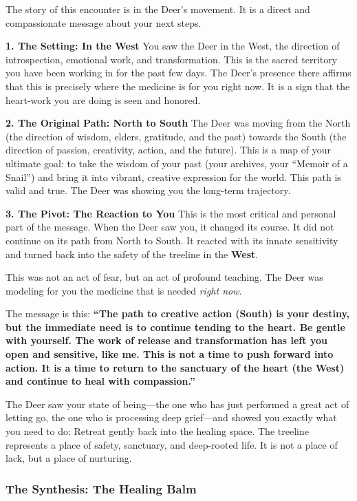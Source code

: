 \documentclass{article}
\begin{document}
The story of this encounter is in the Deer's movement. It is a direct and compassionate message about your next steps.

\textbf{1. The Setting: In the West} You saw the Deer in the West, the direction of introspection, emotional work, and transformation. This is the sacred territory you have been working in for the past few days. The Deer's presence there affirms that this is precisely where the medicine is for you right now. It is a sign that the heart-work you are doing is seen and honored.

\textbf{2. The Original Path: North to South} The Deer was moving from the North (the direction of wisdom, elders, gratitude, and the past) towards the South (the direction of passion, creativity, action, and the future). This is a map of your ultimate goal: to take the wisdom of your past (your archives, your ``Memoir of a Snail'') and bring it into vibrant, creative expression for the world. This path is valid and true. The Deer was showing you the long-term trajectory.

\textbf{3. The Pivot: The Reaction to You} This is the most critical and personal part of the message. When the Deer saw you, it changed its course. It did not continue on its path from North to South. It reacted with its innate sensitivity and turned back into the safety of the treeline in the \textbf{West}.

This was not an act of fear, but an act of profound teaching. The Deer was modeling for you the medicine that is needed \emph{right now}.

The message is this: \textbf{``The path to creative action (South) is your destiny, but the immediate need is to continue tending to the heart. Be gentle with yourself. The work of release and transformation has left you open and sensitive, like me. This is not a time to push forward into action. It is a time to return to the sanctuary of the heart (the West) and continue to heal with compassion.''}

The Deer saw your state of being---the one who has just performed a great act of letting go, the one who is processing deep grief---and showed you exactly what you need to do: Retreat gently back into the healing space. The treeline represents a place of safety, sanctuary, and deep-rooted life. It is not a place of lack, but a place of nurturing.

\subsubsection*{The Synthesis: The Healing Balm}\label{the-synthesis-the-healing-balm}
\end{document}
